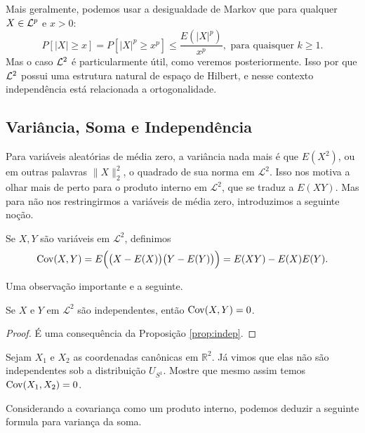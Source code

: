 Mais geralmente, podemos usar a  desigualdade de Markov que para qualquer $X \in {\ensuremath{\mathcal L}}^p$ e $x > 0$:
\begin{equation}
  P[|X| \geq x] = P [|X|^p \geq x^p] \leq \frac{E(|X|^p)}{x^p}, \text{ para quaisquer $k \geq 1$.}
\end{equation}
Mas o caso ${\mathcal L}^2$ é particularmente útil, como veremos posteriormente.
Isso por que  ${\mathcal L}^2$ possui uma estrutura natural de espaço de Hilbert, e nesse contexto independência está relacionada a ortogonalidade.

\subsection{Variância, Soma e Independência }

Para variáveis aleatórias de média zero, a variância nada mais é que $E(X^2)$, ou em outras palavras $\lVert X \rVert^2_2$, o quadrado de sua norma em $\mathcal{L}^2$.
Isso nos motiva a olhar mais de perto para o produto interno em $\mathcal{L}^2$, que se traduz a $E(XY)$.
Mas para não nos restringirmos a variáveis de média zero, introduzimos a seguinte noção.

\begin{definition}
  Se $X, Y$ são variáveis em $\mathcal{L}^2$, definimos
  \begin{equation}
    \operatorname{Cov}(X,Y)
    = E\Big( \big(X - E(X)\big) \big(Y - E(Y)\big) \Big)
    = E(XY) - E(X)E(Y).
  \end{equation}
\end{definition}

Uma observação importante e a seguinte.
\begin{proposition}
  Se $X$ e $Y$ em $\mathcal{L}^2$ são independentes, então $\operatorname{Cov}(X,Y) = 0$.
\end{proposition}

\begin{proof}
 É uma consequência da Proposição \ref{prop:indep}.
\end{proof}

\begin{exercise}
  Sejam $X_1$ e $X_2$ as coordenadas canônicas em $\mathbb{R}^2$.
  Já vimos que elas não são independentes sob a distribuição $U_{S^1}$.
  Mostre que mesmo assim temos $\operatorname{Cov}(X_1, X_2) = 0$.
\end{exercise}

Considerando a covariança como um produto interno, podemos deduzir a seguinte formula para variança da soma.

